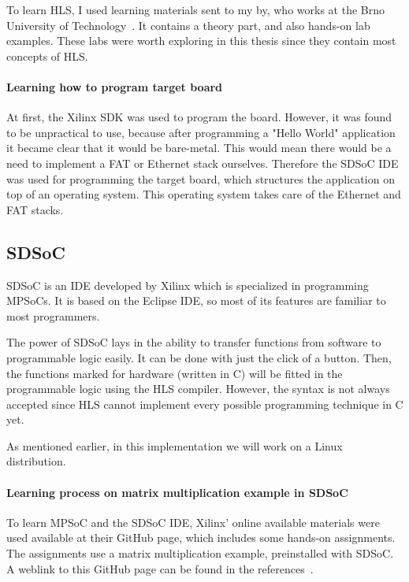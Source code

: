 To learn HLS, I used learning materials sent to my by, who works at the Brno University of Technology~\cite{martinek}. It contains a theory part,  and also hands-on lab examples. These labs were worth exploring in this thesis since they contain most concepts of HLS.

\paragraph{Learning how to program target board}

At first, the Xilinx SDK was used to program the board. However, it was found to be unpractical to use, because after programming a "Hello World" application it became clear that it would be bare-metal. This would mean there would be a need to implement a FAT or Ethernet stack ourselves.
Therefore the SDSoC IDE was used for programming the target board, which structures the application on top of an operating system. This operating system takes care of the Ethernet and FAT stacks.

\subsection{SDSoC}

SDSoC is an IDE developed by Xilinx which is specialized in programming MPSoCs. It is based on the Eclipse IDE, so most of its features are familiar to most programmers. 

The power of SDSoC lays in the ability to transfer functions from software to programmable logic easily. It can be done with just the click of a button. Then, the functions marked for hardware (written in C) will be fitted in the programmable logic using the HLS compiler. However, the syntax is not always accepted since HLS cannot implement every possible programming technique in C yet.

As mentioned earlier, in this implementation we will work on a Linux distribution.

\paragraph{Learning process on matrix multiplication example in SDSoC}

To learn MPSoC and the SDSoC IDE, Xilinx' online available materials were used available at their GitHub page, which includes some hands-on assignments. The assignments use a matrix multiplication example, preinstalled with SDSoC. A weblink to this GitHub page can be found in the references~\cite{sdsoc}.


